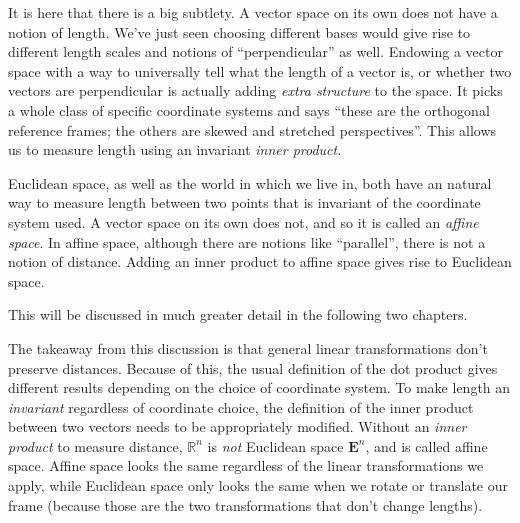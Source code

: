 \documentclass[../master.tex]{subfiles}
\begin{document}
	It is here that there is a big subtlety. A vector space on its own does not have a notion of length. We've just seen choosing different bases would give rise to different length scales and notions of ``perpendicular'' as well. Endowing a vector space with a way to universally tell what the length of a vector is, or whether two vectors are perpendicular is actually adding \emph{extra structure} to the space. It picks a whole class of specific coordinate systems and says ``these are the orthogonal reference frames; the others are skewed and stretched perspectives''. This allows us to measure length using an invariant \emph{inner product}. 
	
	Euclidean space, as well as the world in which we live in, both have an natural way to measure length between two points that is invariant of the coordinate system used. A vector space on its own does not, and so it is called an \emph{affine space}. In affine space, although there are notions like ``parallel'', there is not a notion of distance. Adding an inner product to affine space gives rise to Euclidean space.
	
	
	This will be discussed in much greater detail in the following two chapters. 
	
	The takeaway from this discussion is that general linear transformations don't preserve distances. Because of this, the usual definition of the dot product gives different results depending on the choice of coordinate system. To make length an \emph{invariant} regardless of coordinate choice, the definition of the inner product between two vectors needs to be appropriately modified. Without an \emph{inner product} to measure distance, $\mathbb{R}^n$ is \emph{not} Euclidean space $\mathbf{E}^n$, and is called affine space. Affine space looks the same regardless of the linear transformations we apply, while Euclidean space only looks the same when we rotate or translate our frame (because those are the two transformations that don't change lengths). 
	
\end{document}
